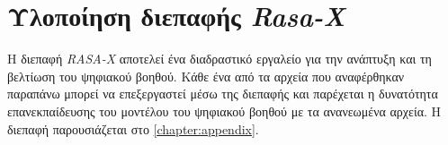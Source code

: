 \section{Υλοποίηση διεπαφής \emph{Rasa-X}}
\label{sec:rasa-x}
Η διεπαφή \emph{RASA-X} αποτελεί ένα διαδραστικό εργαλείο για την ανάπτυξη και τη βελτίωση του ψηφιακού βοηθού. Κάθε ένα από τα αρχεία που αναφέρθηκαν παραπάνω μπορεί να επεξεργαστεί μέσω της διεπαφής και παρέχεται η δυνατότητα επανεκπαίδευσης του μοντέλου του ψηφιακού βοηθού με τα ανανεωμένα αρχεία.
Η διεπαφή παρουσιάζεται στο \autoref{chapter:appendix}.